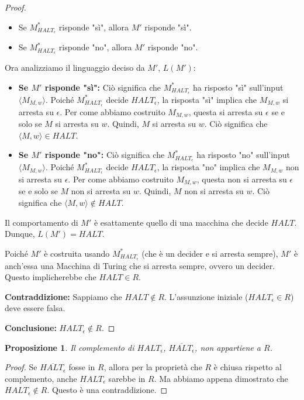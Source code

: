 \documentclass[a4paper, 11pt]{book} %
\newtheorem{proposition}[theorem]{Proposizione}
\theoremstyle{definition}
\begin{document}
\begin{proof}
\begin{enumerate}
\begin{enumerate}
        \begin{itemize}
            \item Se $M_{HALT_\epsilon}^*$ risponde "sì", allora $M'$ risponde "sì".
            \item Se $M_{HALT_\epsilon}^*$ risponde "no", allora $M'$ risponde "no".
        \end{itemize}
    \end{enumerate}
\end{enumerate}
Ora analizziamo il linguaggio deciso da $M'$, $L(M')$:
\begin{itemize}
    \item \textbf{Se $M'$ risponde "sì":}
    Ciò significa che $M_{HALT_\epsilon}^*$ ha risposto "sì" sull'input $\langle M_{M,w} \rangle$.
    Poiché $M_{HALT_\epsilon}^*$ decide $HALT_\epsilon$, la risposta "sì" implica che $M_{M,w}$ si arresta su $\epsilon$.
    Per come abbiamo costruito $M_{M,w}$, questa si arresta su $\epsilon$ se e solo se $M$ si arresta su $w$.
    Quindi, $M$ si arresta su $w$. Ciò significa che $\langle M, w \rangle \in HALT$.
    \item \textbf{Se $M'$ risponde "no":}
    Ciò significa che $M_{HALT_\epsilon}^*$ ha risposto "no" sull'input $\langle M_{M,w} \rangle$.
    Poiché $M_{HALT_\epsilon}^*$ decide $HALT_\epsilon$, la risposta "no" implica che $M_{M,w}$ non si arresta su $\epsilon$.
    Per come abbiamo costruito $M_{M,w}$, questa non si arresta su $\epsilon$ se e solo se $M$ non si arresta su $w$.
    Quindi, $M$ non si arresta su $w$. Ciò significa che $\langle M, w \rangle \notin HALT$.
\end{itemize}
Il comportamento di $M'$ è esattamente quello di una macchina che decide $HALT$. Dunque, $L(M') = HALT$.

Poiché $M'$ è costruita usando $M_{HALT_\epsilon}^*$ (che è un decider e si arresta sempre), $M'$ è anch'essa una Macchina di Turing che si arresta sempre, ovvero un decider.
Questo implicherebbe che $HALT \in R$.

\textbf{Contraddizione:} Sappiamo che $HALT \notin R$.
L'assunzione iniziale ($HALT_\epsilon \in R$) deve essere falsa.

\textbf{Conclusione:} $HALT_\epsilon \notin R$.
\end{proof}

\begin{proposition}
Il complemento di $HALT_\epsilon$, $\overline{HALT_\epsilon}$, non appartiene a $R$.
\end{proposition}
\begin{proof}
Se $\overline{HALT_\epsilon}$ fosse in $R$, allora per la proprietà che $R$ è chiusa rispetto al complemento, anche $HALT_\epsilon$ sarebbe in $R$. Ma abbiamo appena dimostrato che $HALT_\epsilon \notin R$. Questo è una contraddizione.
\end{proof}
\end{document}
